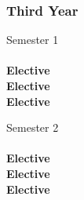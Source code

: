 \subsubsection{Third Year}
\begin{center}
\begin{multicols}{2}
Semester 1 \\
 \\
\textbf{Elective} \\
\textbf{Elective} \\
\textbf{Elective} \\
\vfill
\columnbreak

Semester 2 \\
 \\
\textbf{Elective} \\
\textbf{Elective} \\
\textbf{Elective} \\
\end{multicols}
\end{center}